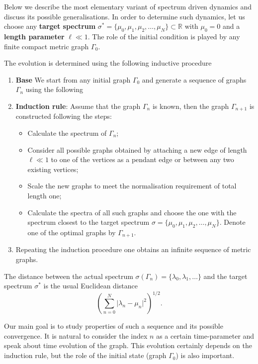 \documentclass[a4paper]{article}
\begin{document}
 
 Below we describe the most elementary variant of spectrum driven dynamics and discuss its possible generalisations. 
 In order to determine such dynamics, let us choose any {\bf target spectrum} $
  \sigma^* = \{ \mu_0, \mu_1, \mu_2, \dots, \mu_N \} \subset \mathbb R $ with $ \mu_0 = 0 $ and a {\bf length parameter} $ \ell \ll 1 $. 
  The role of the initial condition is played by any finite compact metric graph $ \Gamma_0. $
  
  The evolution is determined using the following inductive procedure
 \begin{enumerate}
 \item {\bf Base} 
 \newline We start from any initial graph $ \Gamma_0 $ and generate a sequence of graphs $ \Gamma_n $ using the
 following
  \item {\bf Induction rule}: 
  \newline Assume that the graph $ \Gamma_n $ is known, then the graph $ \Gamma_{n+1} $
  is constructed following the steps: 
  \begin{itemize}
  \item Calculate the spectrum of $ \Gamma_n $;
  \item Consider all possible graphs obtained by attaching a new edge of length $ \ell \ll 1 $ to one of
  the vertices as a pendant edge or between any  two existing vertices;
    \item Scale the new graphs to meet the normalisation requirement of total length one;
  \item Calculate the spectra of all such graphs and choose the one with the spectrum closest to the target spectrum $
  \sigma = \{ \mu_0, \mu_1, \mu_2, \dots, \mu_N \}. $ Denote one of the optimal graphs by $ \Gamma_{n+1}. $
  \end{itemize}
  \item Repeating the induction procedure one obtains an infinite sequence of metric graphs.
 \end{enumerate}
  The distance between the actual spectrum  $ \sigma (\Gamma_{n}) = \{ \lambda_0,  \lambda_1, \dots \} $ and the target spectrum $ \sigma^* $ is the usual Euclidean distance
  \begin{equation}
  \left( \sum_{n=0}^N \vert \lambda_n- \mu_n \vert^2 \right)^{1/2} . 
  \end{equation}
  
  Our main goal is to study properties of such a sequence and its possible convergence. It is natural to consider the index $ n $ as a certain time-parameter
  and speak about time evolution of the graph. This evolution certainly depends   on the induction rule, but the role of the initial state (graph $ \Gamma_0 $)
  is also important. 
  
\end{document}

